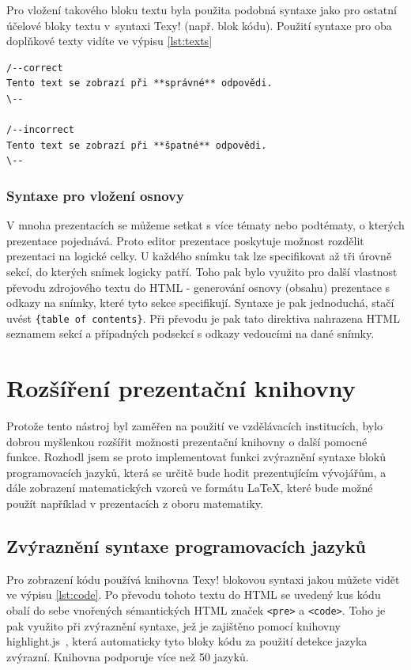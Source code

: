 \documentclass[11pt,twoside,a4paper]{book}
\begin{document}
Pro vložení takového bloku textu byla použita podobná syntaxe jako pro ostatní účelové bloky textu v~syntaxi Texy!
(např. blok kódu). Použití syntaxe pro oba doplňkové texty vidíte ve výpisu \ref{lst:texts}

\begin{lstlisting}[caption={Syntaxe doplňkových textů},label={lst:texts}]
/--correct
Tento text se zobrazí při **správné** odpovědi.
\--

/--incorrect
Tento text se zobrazí při **špatné** odpovědi.
\--
\end{lstlisting}

\subsubsection{Syntaxe pro vložení osnovy}
V mnoha prezentacích se můžeme setkat s více tématy nebo podtématy, o kterých prezentace pojednává. Proto editor prezentace poskytuje možnost rozdělit prezentaci na logické celky. U každého snímku tak lze specifikovat až tři úrovně sekcí, do kterých snímek logicky patří. Toho pak bylo využito pro další vlastnost převodu zdrojového textu do HTML - generování osnovy (obsahu) prezentace s odkazy na snímky, které tyto sekce specifikují. Syntaxe je pak jednoduchá, stačí uvést \verb|{table of contents}|. Při převodu je pak tato direktiva nahrazena HTML seznamem sekcí a případných podsekcí s odkazy vedoucími na dané snímky.


\section{Rozšíření prezentační knihovny}
Protože tento nástroj byl zaměřen na použití ve vzdělávacích institucích, bylo dobrou myšlenkou rozšířit možnosti prezentační knihovny o další pomocné funkce. Rozhodl jsem se proto implementovat funkci zvýraznění syntaxe bloků programovacích jazyků, která se určitě bude hodit prezentujícím vývojářům, a dále zobrazení matematických vzorců ve formátu \LaTeX, které bude možné použít například v prezentacích z oboru matematiky.

\subsection{Zvýraznění syntaxe programovacích jazyků}
Pro zobrazení kódu používá knihovna Texy! blokovou syntaxi jakou můžete vidět ve výpisu \ref{lst:code}. Po převodu tohoto textu do HTML se uvedený kus kódu obalí do sebe vnořených sémantických HTML značek \verb|<pre>| a \verb|<code>|. Toho je pak využito při zvýraznění syntaxe, jež je zajištěno pomocí knihovny highlight.js~\cite{highlight}, která automaticky tyto bloky kódu za použití detekce jazyka zvýrazní. Knihovna podporuje více než 50 jazyků.
\end{document}
